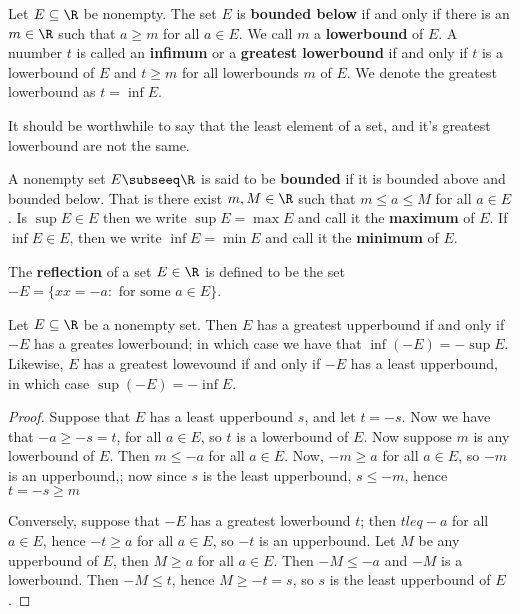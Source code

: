 \begin{definition}
  Let $E \subseteq \R$ be nonempty. The set $E$ is \textbf{bounded below} if and only if there is an $m \in \R$ such that 
  $a \geq m$ for all $a \in E$. We call $m$ a \textbf{lowerbound} of $E$. A nuumber $t$ is called an \textbf{infimum} or a 
  \textbf{greatest lowerbound} if and only if $t$ is a lowerbound of $E$ and $t \geq m$ for all lowerbounds $m$ of $E$. 
  We denote the greatest lowerbound as $t=\inf{E}$.
\end{definition}

It should be worthwhile to say that the least element of a set, and it's greatest lowerbound are not the same.

\begin{definition}
  A nonempty set $E \subseeq \R$ is said to be \textbf{bounded} if it is bounded above and bounded below. That is there exist 
  $m,M \in \R$ such that $m \leq a \leq M$ for all $a \in E$. Is $\sup{E} \in E$ then we write $\sup{E}=\max{E}$ and call it 
  the \textbf{maximum} of $E$. If $\inf{E} \in E$, then we write $\inf{E}=\min{E}$ and call it the \textbf{minimum} of $E$.
\end{definition}

\begin{definition}
  The \textbf{reflection} of a set $E \in \R$ is defined to be the set $-E=\{xx=-a: \text{ for some } a \in E\}$.
\end{definition}

\begin{theorem}
  Let $E \subseteq \R$ be a nonempty set. Then $E$ has a greatest upperbound if and only if $-E$ has a greates lowerbound; 
  in which case we have that $\inf{(-E)}=-\sup{E}$. Likewise, $E$ has a greatest lowevound if and only if $-E$ has a least 
  upperbound, in which case $\sup{(-E)}=-\inf{E}$.
\end{theorem}
\begin{proof}
  Suppose that $E$ has a least upperbound $s$, and let $t=-s$. Now we have that $-a \geq -s=t$, for all $a \in E$, so $t$ is 
  a lowerbound of $E$. Now suppose $m$ is any lowerbound of $E$. Then $m \leq -a$ for all $a \in E$. Now, $-m \geq a$ for all 
  $a \in E$, so $-m$ is an upperbound,; now since $s$ is the least upperbound, $s \leq -m$, hence $t=-s \geq m$

  Conversely, suppose that $-E$ has a greatest lowerbound $t$; then $t leq -a$ for all $a \in E$, hence $-t \geq a$ for all 
  $a \in E$, so $-t$ is an upperbound. Let $M$ be any upperbound of $E$, then $M \geq a$ for all $a \in E$. Then $-M \leq -a$ 
  and $-M$ is a lowerbound. Then $-M \leq t$, hence $M \geq -t=s$, so $s$ is the least upperbound of $E$.
\end{proof}

